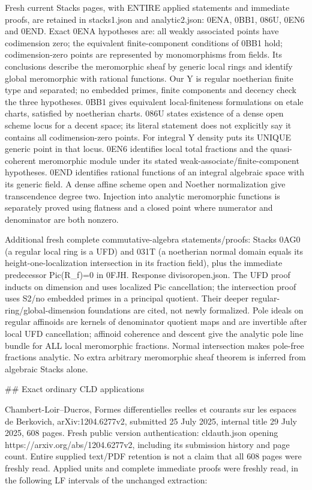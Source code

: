\documentclass[11pt]{article}
\begin{document}
Fresh current Stacks pages, with ENTIRE applied statements and immediate proofs, are retained in stacks1.json and analytic2.json: 0ENA, 0BB1, 086U, 0EN6 and 0END. Exact 0ENA hypotheses are: all weakly associated points have codimension zero; the equivalent finite-component conditions of 0BB1 hold; codimension-zero points are represented by monomorphisms from fields. Its conclusions describe the meromorphic sheaf by generic local rings and identify global meromorphic with rational functions. Our Y is regular noetherian finite type and separated; no embedded primes, finite components and decency check the three hypotheses. 0BB1 gives equivalent local-finiteness formulations on etale charts, satisfied by noetherian charts. 086U states existence of a dense open scheme locus for a decent space; its literal statement does not explicitly say it contains all codimension-zero points. For integral Y density puts its UNIQUE generic point in that locus. 0EN6 identifies local total fractions and the quasi-coherent meromorphic module under its stated weak-associate/finite-component hypotheses. 0END identifies rational functions of an integral algebraic space with its generic field. A dense affine scheme open and Noether normalization give transcendence degree two. Injection into analytic meromorphic functions is separately proved using flatness and a closed point where numerator and denominator are both nonzero.

Additional fresh complete commutative-algebra statements/proofs: Stacks 0AG0 (a regular local ring is a UFD) and 031T (a noetherian normal domain equals its height-one-localization intersection in its fraction field), plus the immediate predecessor Pic(R\_f)=0 in 0FJH. Response divisoropen.json. The UFD proof inducts on dimension and uses localized Pic cancellation; the intersection proof uses S2/no embedded primes in a principal quotient. Their deeper regular-ring/global-dimension foundations are cited, not newly formalized. Pole ideals on regular affinoids are kernels of denominator quotient maps and are invertible after local UFD cancellation; affinoid coherence and descent give the analytic pole line bundle for ALL local meromorphic fractions. Normal intersection makes pole-free fractions analytic. No extra arbitrary meromorphic sheaf theorem is inferred from algebraic Stacks alone.

\#\# Exact ordinary CLD applications

Chambert-Loir--Ducros, Formes differentielles reelles et courants sur les espaces de Berkovich, arXiv:1204.6277v2, submitted 25 July 2025, internal title 29 July 2025, 608 pages. Fresh public version authentication: cldauth.json opening https://arxiv.org/abs/1204.6277v2, including its submission history and page count. Entire supplied text/PDF retention is not a claim that all 608 pages were freshly read. Applied units and complete immediate proofs were freshly read, in the following LF intervals of the unchanged extraction:
\end{document}
